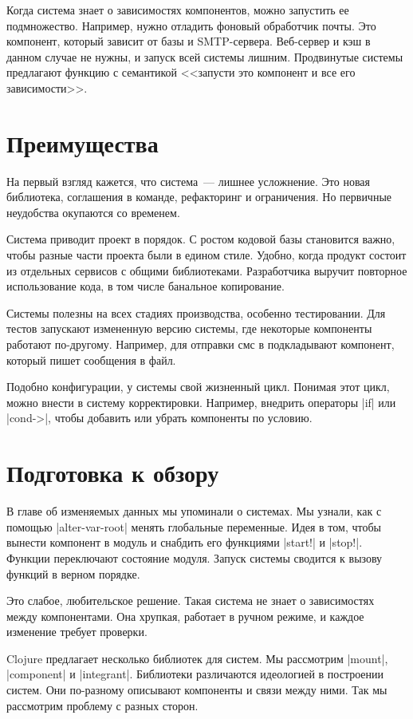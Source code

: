 Когда система знает о зависимостях компонентов, можно запустить ее
подмножество. Например, нужно отладить фоновый обработчик почты. Это компонент,
который зависит от базы и SMTP-сервера. Веб-сервер и кэш в данном случае не
нужны, и запуск всей системы лишним. Продвинутые системы предлагают функцию с
семантикой <<запусти это компонент и все его зависимости>>.

\section{Преимущества}

На первый взгляд кажется, что система~--- лишнее усложнение. Это новая
библиотека, соглашения в команде, рефакторинг и ограничения. Но первичные
неудобства окупаются со временем.

Система приводит проект в порядок. С ростом кодовой базы становится важно, чтобы
разные части проекта были в едином стиле. Удобно, когда продукт состоит из
отдельных сервисов с общими библиотеками. Разработчика выручит повторное
использование кода, в том числе банальное копирование.

Системы полезны на всех стадиях производства, особенно тестировании. Для тестов
запускают измененную версию системы, где некоторые компоненты работают
по-другому. Например, для отправки смс в подкладывают компонент, который пишет
сообщения в файл.

Подобно конфигурации, у системы свой жизненный цикл. Понимая этот цикл, можно
внести в систему корректировки. Например, внедрить операторы \spverb|if| или
\spverb|cond->|, чтобы добавить или убрать компоненты по условию.

\section{Подготовка к обзору}


В главе об изменяемых данных мы упоминали о системах. Мы узнали, как с помощью
\spverb|alter-var-root| менять глобальные переменные. Идея в том, чтобы вынести
компонент в модуль и снабдить его функциями \spverb|start!| и
\spverb|stop!|. Функции переключают состояние модуля. Запуск системы сводится к
вызову функций в верном порядке.

Это слабое, любительское решение. Такая система не знает о зависимостях между
компонентами. Она хрупкая, работает в ручном режиме, и каждое изменение требует
проверки.

Clojure предлагает несколько библиотек для систем. Мы рассмотрим \spverb|mount|,
\spverb|component| и \spverb|integrant|. Библиотеки различаются идеологией в
построении систем. Они по-разному описывают компоненты и связи между ними. Так
мы рассмотрим проблему с разных сторон.

